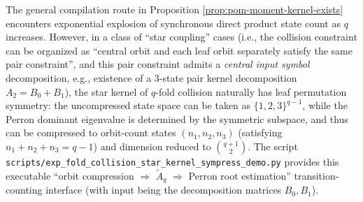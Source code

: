 \begin{remark}\label{rem:pom-star-sympress}
The general compilation route in Proposition \ref{prop:pom-moment-kernel-exists} encounters exponential explosion of synchronous direct product state count as \(q\) increases.
However, in a class of ``star coupling'' cases (i.e., the collision constraint can be organized as ``central orbit and each leaf orbit separately satisfy the same pair constraint'', and this pair constraint admits a \emph{central input symbol} decomposition, e.g., existence of a \(3\)-state pair kernel decomposition \(A_2=B_0+B_1\)),
the star kernel of \(q\)-fold collision naturally has leaf permutation symmetry:
the uncompressed state space can be taken as \(\{1,2,3\}^{q-1}\), while the Perron dominant eigenvalue is determined by the symmetric subspace, and thus can be compressed to orbit-count states
\((n_1,n_2,n_3)\) (satisfying \(n_1+n_2+n_3=q-1\)) and dimension reduced to
\(\binom{q+1}{2}\).
The script \texttt{scripts/exp\_fold\_collision\_star\_kernel\_sympress\_demo.py} provides this executable ``orbit compression \(\Rightarrow\) \(\widetilde A_q\) \(\Rightarrow\) Perron root estimation'' transition-counting interface (with input being the decomposition matrices \(B_0,B_1\)).
\end{remark}

